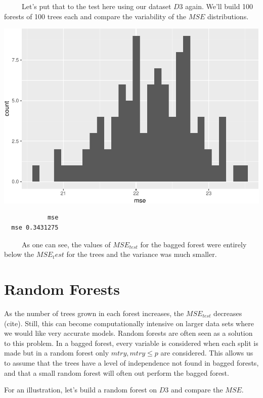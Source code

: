 \documentclass[12pt,twoside]{reedthesis}
\begin{document}
  ~~~~~Let's put that to the test here using our dataset \(D3\) again.
  We'll build 100 forests of 100 trees each and compare the variability of
  the \(MSE\) distributions.
  
  \begin{center}\includegraphics{Thesis_files/figure-latex/unnamed-chunk-12-1} \end{center}
  
  \begin{verbatim}
            mse
  mse 0.3431275
  \end{verbatim}
  
  ~~~~~As one can see, the values of \(MSE_{test}\) for the bagged forest
  were entirely below the \(MSE_test\) for the trees and the variance was
  much smaller.
  
  \section{Random Forests}\label{random-forests}
  
  As the number of trees grown in each forest increases, the
  \(MSE_{test}\) decreases (cite). Still, this can become computationally
  intensive on larger data sets where we would like very accurate models.
  Random forests are often seen as a solution to this problem. In a bagged
  forest, every variable is considered when each split is made but in a
  random forest only \(mtry, mtry \leq p\) are considered. This allows us
  to assume that the trees have a level of independence not found in
  bagged forests, and that a small random forest will often out perform
  the bagged forest.
  
  For an illustration, let's build a random forest on \(D3\) and compare
  the \(MSE\).
  
\end{document}

